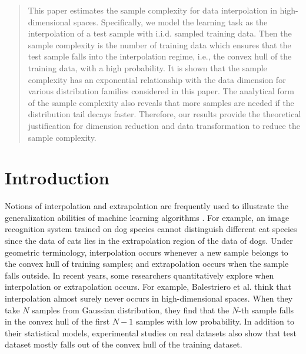 \documentclass[conference,a4paper]{IEEEtran}
\begin{document}
\maketitle

\begin{abstract}
  This paper estimates the sample complexity for data interpolation in high-dimensional spaces.
  Specifically, we model the learning task as the interpolation of a test sample with i.i.d. sampled training data.
  Then the sample complexity is the number of training data which ensures that
  the test sample falls into the interpolation regime, i.e., the convex hull
  of the training data, with a high probability. It is shown that the sample complexity has an exponential relationship with the data dimension for various distribution families
  considered in this paper. The analytical form of the sample complexity also reveals that more samples are needed if the distribution tail decays faster.
  Therefore, our results provide the theoretical justification for dimension reduction and data transformation to reduce the sample complexity.
\end{abstract}


\section{Introduction}
\label{sec:intro}
Notions of interpolation and extrapolation are frequently used to illustrate the generalization
abilities of machine learning algorithms \cite{webb2020learning}. For example,
an image recognition system trained on dog species cannot distinguish different cat species since
the data of cats lies in the extrapolation region of the data of dogs.
Under geometric terminology, interpolation occurs whenever a new sample belongs to the convex hull of training samples;
and extrapolation occurs when the sample falls outside.
In recent years, some researchers quantitatively explore when interpolation or extrapolation occurs.
For example, Balestriero et al. \cite{balestriero2021learning}
think that interpolation almost surely never occurs in high-dimensional spaces.
When they take $N$ samples from Gaussian distribution,
they find that the $N$-th sample falls in the convex hull of the first $N-1$ samples
with low probability.
In addition to their statistical models,
experimental studies on real datasets \cite{yousefzadeh2022extent} also show that
test dataset mostly falls out of the
convex hull of the training dataset.
\end{document}
